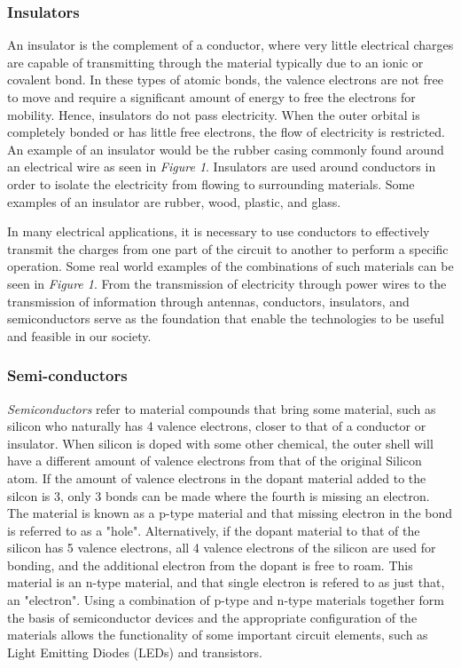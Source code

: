 \documentclass[12pt]{article}
\begin{document}
\subsubsection{Insulators}
An insulator is the complement of a conductor, where very little electrical charges are capable of transmitting through the material typically due to an ionic or covalent bond. In these types of atomic bonds, the valence electrons are not free to move and require a significant amount of energy to free the electrons for mobility. Hence, insulators do not pass electricity. When the outer orbital is completely bonded or has little free electrons, the flow of electricity is restricted. An example of an insulator would be the rubber casing commonly found around an electrical wire as seen in \textit{Figure 1}. Insulators are used around conductors in order to isolate the electricity from flowing to surrounding materials. Some examples of an insulator are rubber, wood, plastic, and glass. 

In many electrical applications, it is necessary to use conductors to effectively transmit the charges from one part of the circuit to another to perform a specific operation. Some real world examples of the combinations of such materials can be seen in \textit{Figure 1}. From the transmission of electricity through power wires to the transmission of information through antennas, conductors, insulators, and semiconductors serve as the foundation that enable the technologies to be useful and feasible in our society.

\subsubsection{Semi-conductors}
\textit{Semiconductors} refer to material compounds that bring some material, such as silicon who naturally has 4 valence electrons, closer to that of a conductor or insulator. When silicon is doped with some other chemical, the outer shell will have a different amount of valence electrons from that of the original Silicon atom. If the amount of valence electrons in the dopant material added to the silcon is 3, only 3 bonds can be made where the fourth is missing an electron. The material is known as a p-type material and that missing electron in the bond is referred to as a "hole". Alternatively, if the dopant material to that of the silicon has 5 valence electrons, all 4 valence electrons of the silicon are used for bonding, and the additional electron from the dopant is free to roam. This material is an n-type material, and that single electron is refered to as just that, an "electron". Using a combination of p-type and n-type materials together form the basis of semiconductor devices and the appropriate configuration of the materials allows the functionality of some important circuit elements, such as Light Emitting Diodes (LEDs) and transistors.
\end{document}
